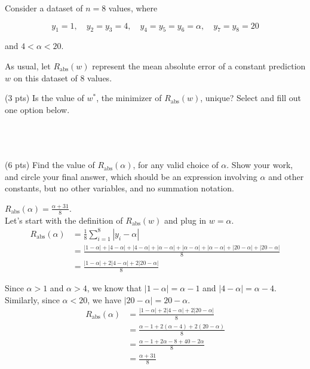 \documentclass[11pt]{article}
\begin{document}
\begin{prob}
Consider a dataset of $n = 8$ values, where

$$y_1 = 1,\quad y_2 = y_3 = 4, \quad y_4 = y_5 = y_6 = \alpha,\quad y_7 = y_8 = 20$$

and $4 < \alpha < 20$.

As usual, let $R_\text{abs}(w)$ represent the mean absolute error of a constant prediction $w$ on this dataset of 8 values.

\begin{subprob}(3 pts) Is the value of $w^*$, the minimizer of $R_\text{abs}(w)$, unique? Select and fill out one option below. \\

 \\ \\ \\
\end{subprob}

\begin{subprob}(6 pts) Find the value of $R_\text{abs}(\alpha)$, for any valid choice of $\alpha$. Show your work, and $\boxed{\text{circle}}$ your final answer, which should be an expression involving $\alpha$ and other constants, but no other variables, and no summation notation. \\

\emptybox{10cm}

\begin{solution}
$R_\text{abs}(\alpha) = \frac{\alpha + 31}{8}$. \\

Let's start with the definition of $R_\text{abs}(w)$ and plug in $w = \alpha$.
\begin{align*}
  R_\text{abs}(\alpha) &= \frac{1}{8} \sum_{i=1}^8 |y_i - \alpha| \\
  &= \frac{|1 - \alpha| + |4 - \alpha| + |4 - \alpha| + |\alpha - \alpha| + |\alpha - \alpha| + |\alpha - \alpha| + |20 - \alpha| + |20 - \alpha|}{8} \\
  &= \frac{|1 - \alpha| + 2|4 - \alpha| + 2|20 - \alpha|}{8}
\end{align*}

Since $\alpha > 1$ and $\alpha > 4$, we know that $|1 - \alpha| = \alpha - 1$ and $|4 - \alpha| = \alpha - 4$. Similarly, since $\alpha < 20$, we have $|20 - \alpha| = 20 - \alpha$.
\begin{align*}
  R_\text{abs}(\alpha) &= \frac{|1 - \alpha| + 2|4 - \alpha| + 2|20 - \alpha|}{8} \\
  &= \frac{\alpha - 1 + 2(\alpha - 4) + 2(20 - \alpha)}{8} \\
  &= \frac{\alpha - 1 + 2\alpha - 8 + 40 - 2\alpha}{8} \\
  &= \frac{\alpha + 31}{8}
\end{align*}


\end{solution}
\end{subprob}
\end{prob}
\end{document}
